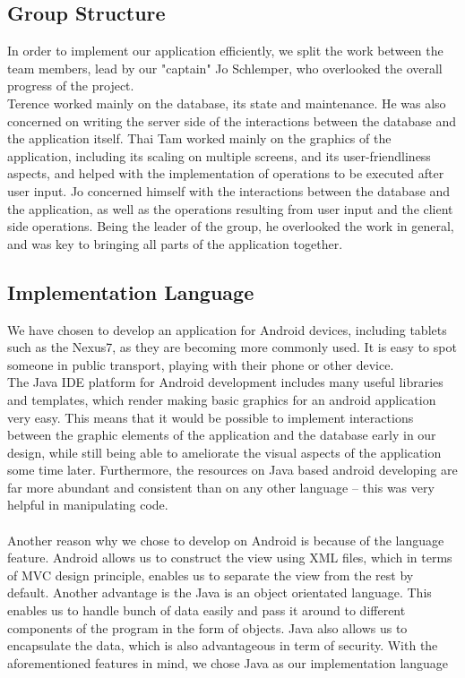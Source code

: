 \documentclass[a4paper,11pt]{article}
\begin{document}
\subsection*{Group Structure}
In order to implement our application efficiently, we split the work between the team members, lead by our "captain" Jo Schlemper, who overlooked the overall progress of the project. \\
Terence worked mainly on the database, its state and maintenance. He was also concerned on writing the server side of the interactions between the database and the application itself.
Thai Tam worked mainly on the graphics of the application, including its scaling on multiple screens, and its user-friendliness aspects, and helped with the implementation of operations to be executed after user input.
Jo concerned himself with the interactions between the database and the application, as well as the operations resulting from user input and the client side operations. Being the leader of the group, he overlooked the work in general, and was key to bringing all parts of the application together.
 
\subsection*{Implementation Language}
We have chosen to develop an application for Android devices, including tablets such as the Nexus7, as they are becoming more commonly used. It is easy to spot someone in public transport, playing with their phone or other device.  \\
The Java IDE platform for Android development includes many useful libraries and templates, which render making basic graphics for an android application very easy. This means that it would be possible to implement interactions between the graphic elements of the application and the database early in our design, while still being able to ameliorate the visual aspects of the application some time later. Furthermore, the resources on Java based android developing are far more abundant and consistent than on any other language – this was very helpful in manipulating code.\\
\\
Another reason why we chose to develop on Android is because of the language feature. Android allows us to construct the view using XML files, which in terms of MVC design principle, enables us to separate the view from the rest by default. Another advantage is the Java is an object orientated language. This enables us to handle bunch of data easily and pass it around to different components of the program in the form of objects. Java also allows us to encapsulate the data, which is also advantageous in term of security. With the aforementioned features in mind, we chose Java as our implementation language
\end{document}
